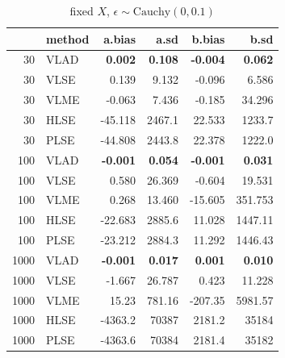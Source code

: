 \documentclass[twoside]{article}
\begin{document}
\begin{table}[ht]
\centering
\caption{fixed $X$, $\epsilon \sim \mathrm{Cauchy}(0,0.1)$}
\begin{tabular}{rlrrrr}
  \hline
 & method & a.bias & a.sd & b.bias & b.sd \\ 
  \hline
  30 & VLAD & \textbf{0.002} & \textbf{0.108} & \textbf{-0.004} & \textbf{0.062} \\ 
  30 & VLSE & 0.139 & 9.132 & -0.096 & 6.586 \\ 
  30 & VLME & -0.063 & 7.436 & -0.185 & 34.296 \\ 
  30 & HLSE & -45.118 & 2467.1 & 22.533 & 1233.7 \\ 
  30 & PLSE & -44.808 & 2443.8 & 22.378 & 1222.0 \\ 
  \hline
  100 & VLAD & \textbf{-0.001} & \textbf{0.054} & \textbf{-0.001} & \textbf{0.031} \\ 
  100 & VLSE & 0.580 & 26.369 & -0.604 & 19.531 \\ 
  100 & VLME & 0.268 & 13.460 & -15.605 & 351.753 \\ 
  100 & HLSE & -22.683 & 2885.6 & 11.028 & 1447.11 \\ 
  100 & PLSE & -23.212 & 2884.3 & 11.292 & 1446.43 \\ 
  \hline
  1000 & VLAD & \textbf{-0.001} & \textbf{0.017} & \textbf{0.001} & \textbf{0.010} \\ 
  1000 & VLSE & -1.667 & 26.787 & 0.423 & 11.228 \\ 
  1000 & VLME & 15.23 & 781.16 & -207.35 & 5981.57 \\ 
  1000 & HLSE & -4363.2 & 70387 & 2181.2 & 35184 \\ 
  1000 & PLSE & -4363.6 & 70384 & 2181.4 & 35182 \\ 
  \hline
\end{tabular}
\end{table}
\end{document}
